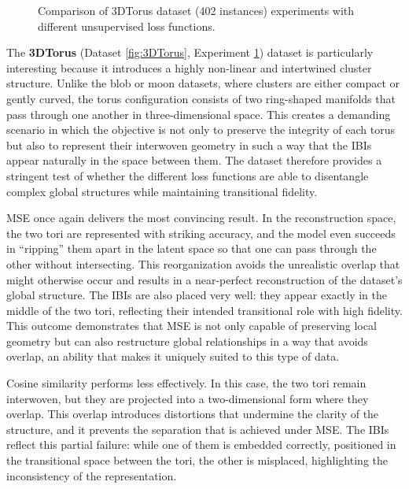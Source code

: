 \begin{figure}[htbp]
  \caption{Comparison of 3DTorus dataset (402 instances) experiments with different unsupervised loss functions.}
  \label{fig:RQ2/3DTorus}
\end{figure}

The \textbf{3DTorus} (Dataset \ref{fig:3DTorus}, Experiment \ref{fig:RQ2/3DTorus}) dataset is particularly interesting because it introduces a highly non-linear and intertwined cluster structure. Unlike the blob or moon datasets, where clusters are either compact or gently curved, the torus configuration consists of two ring-shaped manifolds that pass through one another in three-dimensional space. This creates a demanding scenario in which the objective is not only to preserve the integrity of each torus but also to represent their interwoven geometry in such a way that the IBIs appear naturally in the space between them. The dataset therefore provides a stringent test of whether the different loss functions are able to disentangle complex global structures while maintaining transitional fidelity.

MSE once again delivers the most convincing result. In the reconstruction space, the two tori are represented with striking accuracy, and the model even succeeds in “ripping” them apart in the latent space so that one can pass through the other without intersecting. This reorganization avoids the unrealistic overlap that might otherwise occur and results in a near-perfect reconstruction of the dataset’s global structure. The IBIs are also placed very well: they appear exactly in the middle of the two tori, reflecting their intended transitional role with high fidelity. This outcome demonstrates that MSE is not only capable of preserving local geometry but can also restructure global relationships in a way that avoids overlap, an ability that makes it uniquely suited to this type of data.

Cosine similarity performs less effectively. In this case, the two tori remain interwoven, but they are projected into a two-dimensional form where they overlap. This overlap introduces distortions that undermine the clarity of the structure, and it prevents the separation that is achieved under MSE. The IBIs reflect this partial failure: while one of them is embedded correctly, positioned in the transitional space between the tori, the other is misplaced, highlighting the inconsistency of the representation.

